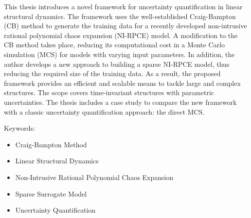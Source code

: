 %
%

\label{cha:abtract} 

This thesis introduces a novel framework for uncertainty quantification in linear structural dynamics.
The framework uses the well-established Craig-Bampton (CB) method to generate the training data for a recently developed non-intrusive rational polynomial chaos expansion (NI-RPCE) model.
A modification to the CB method takes place, reducing its computational cost in a Monte Carlo simulation (MCS) for models with varying input parameters.
In addition, the author develops a new approach to building a sparse NI-RPCE model, thus reducing the required size of the training data.
As a result, the proposed framework provides an efficient and scalable means to tackle large and complex structures.
The scope covers time-invariant structures with parametric uncertainties.
The thesis includes a case study to compare the new framework with a classic uncertainty quantification approach: the direct MCS.


Keywords: 
\begin{itemize}
 \item Craig-Bampton Method
 \item Linear Structural Dynamics
 \item Non-Intrusive Rational Polynomial Chaos Expansion
 \item Sparse Surrogate Model
 \item Uncertainty Quantification
\end{itemize}